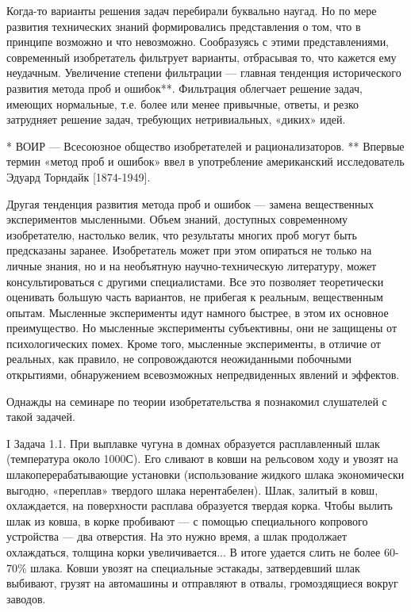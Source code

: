 Когда-то  варианты  решения  задач  перебирали  буквально  наугад.  Но
по  мере развития  технических  знаний  формировались представления  о
том,  что  в  принципе  возможно   и  что  невозможно.  Сообразуясь  с
этими  представлениями, современный  изобретатель фильтрует  варианты,
отбрасывая  то,   что  кажется   ему  неудачным.   Увеличение  степени
фильтрации —  главная тенденция  исторического развития метода  проб и
ошибок**. Фильтрация облегчает решение задач, имеющих нормальные, т.е.
более или менее  привычные, ответы, и резко  затрудняет решение задач,
требующих нетривиальных, «диких» идей.

*  ВОИР  —  Всесоюзное   общество  изобретателей  и
рационализаторов.   **   Впервые   термин  «метод   проб   и   ошибок»
ввел  в   употребление  американский  исследователь   Эдуард  Торндайк
[1874-1949].


Другая тенденция развития  метода проб и ошибок  — замена вещественных
экспериментов   мысленными.  Объем   знаний,  доступных   современному
изобретателю,  настолько  велик,  что  результаты  многих  проб  могут
быть  предсказаны заранее.  Изобретатель может  при этом  опираться не
только  на  личные  знания,  но  и  на  необъятную  научно-техническую
литературу, может  консультироваться с другими специалистами.  Все это
позволяет теоретически оценивать большую  часть вариантов, не прибегая
к реальным,  вещественным опытам. Мысленные эксперименты  идут намного
быстрее, в  этом их  основное преимущество. Но  мысленные эксперименты
субъективны,  они   не  защищены   от  психологических   помех.  Кроме
того,  мысленные эксперименты,  в  отличие от  реальных, как  правило,
не  сопровождаются  неожиданными  побочными  открытиями,  обнаружением
всевозможных непредвиденных явлений и эффектов.


Однажды на семинаре по теории изобретательства я познакомил слушателей
с такой задачей.

I Задача  1.1. При выплавке  чугуна в домнах  образуется расплавленный
шлак (температура около 1000С). Его сливают в ковши на рельсовом ходу
и  увозят на  шлакоперерабатывающие  установки (использование  жидкого
шлака экономически  выгодно, «переплав» твердого  шлака нерентабелен).
Шлак, залитый в ковш,  охлаждается, на поверхности расплава образуется
твердая  корка.  Чтобы вылить  шлак  из  ковша,  в корке  пробивают  —
с  помощью  специального  копрового  устройства —  два  отверстия.  На
это  нужно  время,  а   шлак  продолжает  охлаждаться,  толщина  корки
увеличивается... В  итоге удается слить  не более 60-70\%  шлака. Ковши
увозят на специальные эстакады,  затвердевший шлак выбивают, грузят на
автомашины и отправляют в отвалы, громоздящиеся вокруг заводов.

